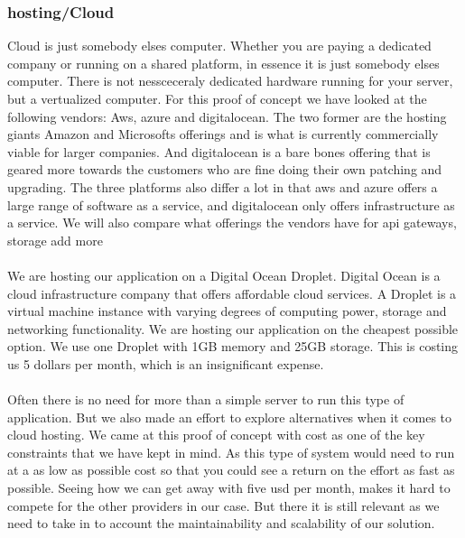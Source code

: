 \documentclass[]{uiophd}
\begin{document}
\subsubsection{hosting/Cloud}
Cloud is just somebody elses computer. Whether you are paying a dedicated company or running on a shared platform, in essence it is just somebody elses computer. There is not nessceceraly dedicated hardware running for your server, but a vertualized computer. For this proof of concept we have looked at the following vendors: Aws, azure and digitalocean. The two former are the hosting giants Amazon and Microsofts offerings and is what is currently commercially viable for larger companies. And digitalocean is a bare bones offering that is geared more towards the customers who are fine doing their own patching and upgrading. The three platforms also differ a lot in that aws and azure offers a large range of software as a service, and digitalocean only offers infrastructure as a service. We will also compare what offerings the vendors have for api gateways, storage {add more}
\\\\
We are hosting our application on a Digital Ocean Droplet. Digital Ocean is a cloud infrastructure company that offers affordable cloud services. A Droplet is a virtual machine instance with varying degrees of computing power, storage and networking functionality. We are hosting our application on the cheapest possible option. We use one Droplet with 1GB memory and 25GB storage. This is costing us 5 dollars per month, which is an insignificant expense. 
\\\\
Often there is no need for more than a simple server to run this type of application. But we also made an effort to explore alternatives when it comes to cloud hosting. We came at this proof of concept with cost as one of the key constraints that we have kept in mind. As this type of system would need to run at a as low as possible cost so that you could see a return on the effort as fast as possible. Seeing how we can get away with five usd per month, makes it hard to compete for the other providers in our case. But there it is still relevant as we need to take in to account the maintainability and scalability of our solution.
\end{document}
